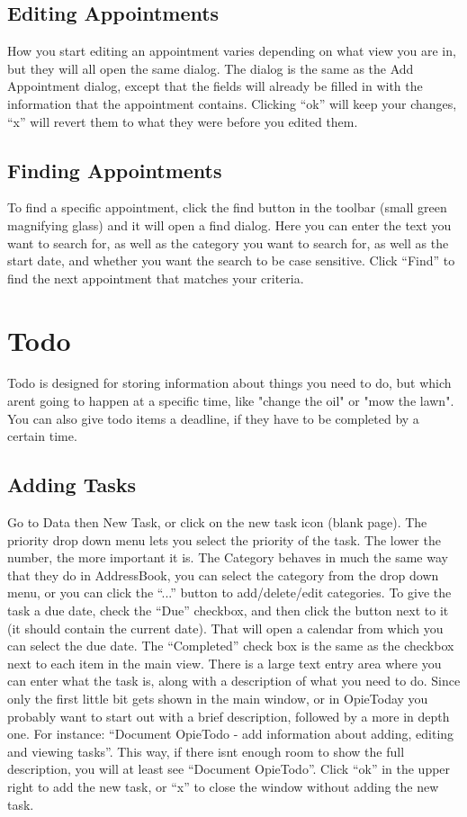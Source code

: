\documentclass[12pt,letterpaper,oneside, openany]{book} \usepackage[latin1] {inputenc}
\begin{document}
\section{Editing Appointments}

How you start editing an appointment varies depending on what view you are in, but they will all open the same dialog. The dialog is the same as the Add Appointment dialog, except that the fields will already be filled in with the information that the appointment contains. Clicking ``ok'' will keep your changes, ``x'' will revert them to what they were before you edited them. 


\section{Finding Appointments}

To find a specific appointment, click the find button in the toolbar (small green magnifying glass) and it will open a find dialog. Here you can enter the text you want to search for, as well as the category you want to search for, as well as the start date, and whether you want the search to be case sensitive. Click ``Find'' to find the next appointment that matches your criteria.

\chapter{Todo}
Todo is designed for storing information about things you need to do, but which arent going to happen at a specific time, like "change the oil" or "mow the lawn". You can also give todo items a deadline, if they have to be completed by a certain time. 

\section{Adding Tasks}

Go to Data then New Task, or click on the new task icon (blank page). The priority drop down menu lets you select the priority of the task. The lower the number, the more important it is. The Category behaves in much the same way that they do in AddressBook, you can select the category from the drop down menu, or you can click the ``...'' button to add/delete/edit categories. To give the task a due date, check the ``Due'' checkbox, and then click the button next to it (it should contain the current date). That will open a calendar from which you can select the due date. The ``Completed'' check box is the same as the checkbox next to each item in the main view. There is a large text entry area where you can enter what the task is, along with a description of what you need to do. Since only the first little bit gets shown in the main window, or in OpieToday you probably want to start out with a brief description, followed by a more in depth one. For instance: ``Document OpieTodo - add information about adding, editing and viewing tasks''. This way, if there isnt enough room to show the full description, you will at least see ``Document OpieTodo''. Click ``ok'' in the upper right to add the new task, or ``x'' to close the window without adding the new task. 
\end{document}
